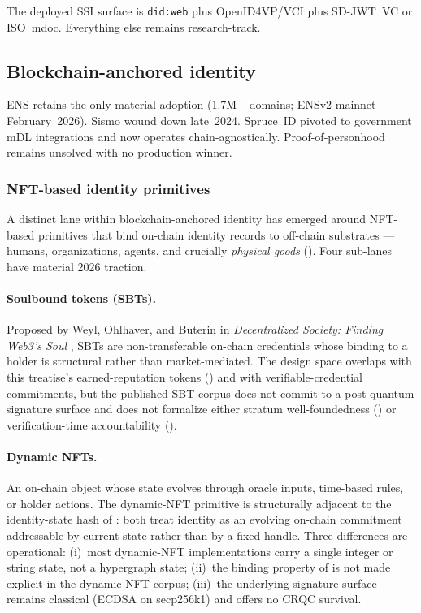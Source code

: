 \documentclass[11pt,a4paper,parskip=half-,DIV=12,headings=standardclasses]{scrartcl}
\theoremstyle{ncthm}
\theoremstyle{ncdef}
\begin{document}
The deployed SSI surface is \texttt{did:web} plus OpenID4VP/VCI plus
SD-JWT~VC or ISO~mdoc. Everything else remains research-track.

\subsection{Blockchain-anchored identity}

ENS retains the only material adoption (1.7M+ domains; ENSv2 mainnet
February~2026). Sismo wound down late~2024. Spruce~ID pivoted to
government mDL integrations and now operates chain-agnostically.
Proof-of-personhood remains unsolved with no production winner.

\subsubsection*{NFT-based identity primitives}\label{subsec:nft-identity}

A distinct lane within blockchain-anchored identity has emerged around
NFT-based primitives that bind on-chain identity records to off-chain
substrates --- humans, organizations, agents, and crucially
\emph{physical goods} (). Four sub-lanes
have material 2026 traction.

\paragraph{Soulbound tokens (SBTs).} Proposed by Weyl, Ohlhaver, and
Buterin in \emph{Decentralized Society: Finding Web3's Soul}
\cite{weyl-soulbound-2022}, SBTs are non-transferable on-chain
credentials whose binding to a holder is structural rather than
market-mediated. The design space overlaps with this treatise's
earned-reputation tokens () and with
verifiable-credential commitments, but the published SBT corpus does
not commit to a post-quantum signature surface and does not formalize
either stratum well-foundedness () or
verification-time accountability ().

\paragraph{Dynamic NFTs.} \cite{chainlink-dnft} An on-chain object
whose state evolves through oracle inputs, time-based rules, or holder
actions. The dynamic-NFT primitive is structurally adjacent to the
identity-state hash of : both treat identity as
an evolving on-chain commitment addressable by current state rather
than by a fixed handle. Three differences are operational: (i)~most
dynamic-NFT implementations carry a single integer or string state,
not a hypergraph state; (ii)~the binding property of
 is not made explicit in the
dynamic-NFT corpus; (iii)~the underlying signature surface remains
classical (ECDSA on secp256k1) and offers no CRQC survival.
\end{document}
